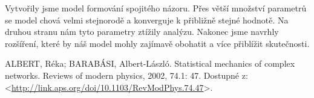 \documentclass[10pt,a4paper]{report}
\begin{document}
Vytvořily jsme model formování spojitého názoru. Přes větší množství parametrů se model chová velmi stejnorodě a konverguje k přibližně stejné hodnotě. Na druhou stranu nám tyto parametry ztížily analýzu. Nakonec jsme navrhly rozšíření, které by náš model mohly zajímavě obohatit a více přiblížit skutečnosti.

\markboth{}{}
\bgroup

\begin{thebibliography}{9}
ALBERT, Réka; BARABÁSI, Albert-László. Statistical mechanics of complex networks. Reviews of modern physics, 2002, 74.1: 47. Dostupné z: <\url{http://link.aps.org/doi/10.1103/RevModPhys.74.47}>.
\end{thebibliography}
\egroup





\end{document}
